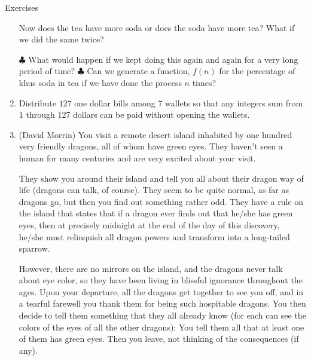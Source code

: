 \begin{xcb}{Exercises}
\begin{enumerate}
Now does the tea have more soda or does the soda have more tea? What if we did the same twice?


\(\clubsuit\)  What would happen if we kept doing this again and again for a very long period of time? $\clubsuit$ Can we generate a function, $f(n)$ for the percentage of khus soda in tea if we have done the process $n$ times?
\begin{hint}
\end{hint}

\item {} Distribute \(127\) one dollar bills among \(7\) wallets so that any integers sum 
from \(1\) through \(127\) dollars can be paid without opening the wallets.
\begin{hint}
\end{hint}

\item (David Morrin)  You visit a remote desert island inhabited by one hundred very friendly
dragons, all of whom have green eyes. They haven’t seen a human for many centuries and are very 
excited about your visit. 

They show you around their island and tell you all about their dragon way of life (dragons can talk, of course).
They seem to be quite normal, as far as dragons go, but then you find out something rather odd. 
They have a rule on the island that states that if a dragon ever finds out that he/she has green eyes, 
then at precisely midnight at the end of the day of this discovery, he/she must relinquish all dragon powers and transform into a long-tailed sparrow. 

However, there are no mirrors on the island, and the dragons never talk about eye color, 
so they have been living in blissful ignorance throughout the ages. 
Upon your departure, all the dragons get together to see you off, and in a tearful farewell you thank them for being such hospitable dragons. 
You then decide to tell them something that they all already know (for each can see the colors of the eyes of all the other dragons): 
You tell them all that at least one of them has green eyes. Then you leave, not thinking of the consequences (if any). 


\end{enumerate}
\end{xcb}
